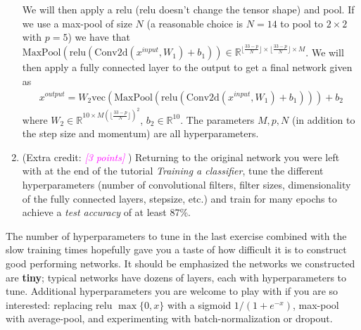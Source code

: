 \documentclass{article}
\newcommand{\field}[1]{\mathbb{#1}}
\newcommand{\1}{\mathbf{1}}
\newcommand{\R}{\field{R}} %
\def\vec{\text{vec}}
\newcommand{\grade}[1]{\small\textcolor{magenta}{\emph{[#1 points]}} \normalsize}
\begin{document}
\begin{enumerate}
  We will then apply a relu (relu doesn't change the tensor shape) and pool. 
  If we use a max-pool of size $N$ (a reasonable choice is $N=14$ to pool to $2 \times 2$ with $p=5$) we have that $\textrm{MaxPool}( \mathrm{relu}( \mathrm{Conv2d}(x^{input}, W_1)+b_1)) \in \R^{\lfloor\frac{33-p}{N}\rfloor \times \lfloor\frac{33-p}{N}\rfloor \times M}$.
  We will then apply a fully connected layer to the output to get a final network given as
  \begin{align*}
  x^{output} = W_2 \vec(\textrm{MaxPool}( \mathrm{relu}( \mathrm{Conv2d}(x^{input}, W_1)+b_1))) + b_2
  \end{align*}
  where $W_2 \in \R^{10 \times M (\lfloor\frac{33-p}{N}\rfloor)^2}$, $b_2 \in \R^{10}$.
  The parameters $M,p,N$ (in addition to the step size and momentum) are all hyperparameters.
  \item (Extra credit: \grade{3}) Returning to the original network you were left with at the end of the tutorial \emph{Training a classifier}, tune the different hyperparameters (number of convolutional filters, filter sizes, dimensionality of the fully connected layers, stepsize, etc.) and train for many epochs to achieve a \emph{test accuracy} of at least 87\%. 
\end{enumerate}
The number of hyperparameters to tune in the last exercise combined with the slow training times hopefully gave you a taste of how difficult it is to construct good performing networks. 
It should be emphasized the networks we constructed are \textbf{tiny}; typical networks have dozens of layers, each with hyperparameters to tune. 
Additional hyperparameters you are welcome to play with if you are so interested: replacing relu $\max\{0,x\}$ with a sigmoid $1/(1+e^{-x})$, max-pool with average-pool, and experimenting with batch-normalization or dropout.
\end{document}
